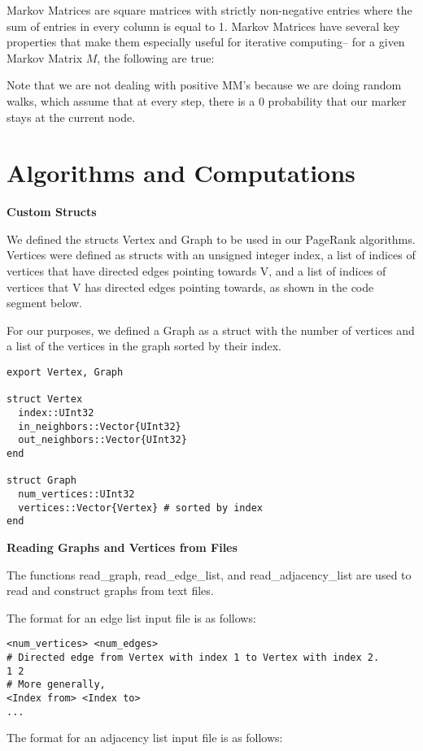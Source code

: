 \documentclass[12pt, titlepage, twoside]{amsart}
\theoremstyle{remark}
\begin{document}
Markov Matrices are square matrices with strictly non-negative entries where the sum of entries in every column is equal to 1. Markov Matrices have several key properties that make them especially useful for iterative computing-- for a given Markov Matrix $M$, the following are true:


Note that we are not dealing with positive MM's because we are doing random walks, which assume that at every step, there is a 0 probability that our marker stays at the current node.


\section{Algorithms and Computations}

\textbf{Custom Structs}

We defined the structs Vertex and Graph to be used in our PageRank algorithms. Vertices were defined as structs with an unsigned integer index, a list of indices of vertices that have directed edges pointing towards V, and a list of indices of vertices that V has directed edges pointing towards, as shown in the code segment below. 

For our purposes, we defined a Graph as a struct with the number of vertices and a list of the vertices in the graph sorted by their index.

\begin{lstlisting}
export Vertex, Graph

struct Vertex
  index::UInt32
  in_neighbors::Vector{UInt32}
  out_neighbors::Vector{UInt32}
end

struct Graph
  num_vertices::UInt32
  vertices::Vector{Vertex} # sorted by index
end
\end{lstlisting}


\textbf{Reading Graphs and Vertices from Files}

The functions read\_graph, read\_edge\_list, and read\_adjacency\_list are used to read and construct graphs from text files.

The format for an edge list input file is as follows:

\begin{lstlisting}[basicstyle=\small]
<num_vertices> <num_edges>
# Directed edge from Vertex with index 1 to Vertex with index 2.
1 2
# More generally,
<Index from> <Index to>
...
\end{lstlisting}

The format for an adjacency list input file is as follows:
\end{document}
